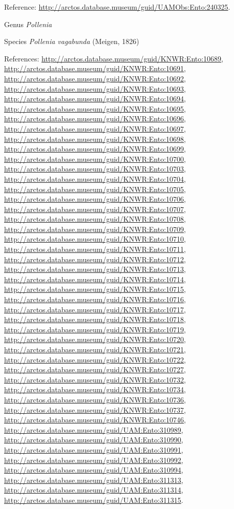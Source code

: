 \documentclass[9pt, article]{memoir}
\begin{document}
\begin{multicols}{2}
\vspace{6pt}Reference: 
\url{http://arctos.database.museum/guid/UAMObs:Ento:240325}.

\vspace{6pt}\noindent\hspace{30pt}Genus \textit{Pollenia}


\vspace{6pt}\noindent\hspace{36pt}Species \textit{Pollenia vagabunda} (Meigen, 1826)


\vspace{6pt}References: 
\url{http://arctos.database.museum/guid/KNWR:Ento:10689}, 
\url{http://arctos.database.museum/guid/KNWR:Ento:10691}, 
\url{http://arctos.database.museum/guid/KNWR:Ento:10692}, 
\url{http://arctos.database.museum/guid/KNWR:Ento:10693}, 
\url{http://arctos.database.museum/guid/KNWR:Ento:10694}, 
\url{http://arctos.database.museum/guid/KNWR:Ento:10695}, 
\url{http://arctos.database.museum/guid/KNWR:Ento:10696}, 
\url{http://arctos.database.museum/guid/KNWR:Ento:10697}, 
\url{http://arctos.database.museum/guid/KNWR:Ento:10698}, 
\url{http://arctos.database.museum/guid/KNWR:Ento:10699}, 
\url{http://arctos.database.museum/guid/KNWR:Ento:10700}, 
\url{http://arctos.database.museum/guid/KNWR:Ento:10703}, 
\url{http://arctos.database.museum/guid/KNWR:Ento:10704}, 
\url{http://arctos.database.museum/guid/KNWR:Ento:10705}, 
\url{http://arctos.database.museum/guid/KNWR:Ento:10706}, 
\url{http://arctos.database.museum/guid/KNWR:Ento:10707}, 
\url{http://arctos.database.museum/guid/KNWR:Ento:10708}, 
\url{http://arctos.database.museum/guid/KNWR:Ento:10709}, 
\url{http://arctos.database.museum/guid/KNWR:Ento:10710}, 
\url{http://arctos.database.museum/guid/KNWR:Ento:10711}, 
\url{http://arctos.database.museum/guid/KNWR:Ento:10712}, 
\url{http://arctos.database.museum/guid/KNWR:Ento:10713}, 
\url{http://arctos.database.museum/guid/KNWR:Ento:10714}, 
\url{http://arctos.database.museum/guid/KNWR:Ento:10715}, 
\url{http://arctos.database.museum/guid/KNWR:Ento:10716}, 
\url{http://arctos.database.museum/guid/KNWR:Ento:10717}, 
\url{http://arctos.database.museum/guid/KNWR:Ento:10718}, 
\url{http://arctos.database.museum/guid/KNWR:Ento:10719}, 
\url{http://arctos.database.museum/guid/KNWR:Ento:10720}, 
\url{http://arctos.database.museum/guid/KNWR:Ento:10721}, 
\url{http://arctos.database.museum/guid/KNWR:Ento:10722}, 
\url{http://arctos.database.museum/guid/KNWR:Ento:10727}, 
\url{http://arctos.database.museum/guid/KNWR:Ento:10732}, 
\url{http://arctos.database.museum/guid/KNWR:Ento:10734}, 
\url{http://arctos.database.museum/guid/KNWR:Ento:10736}, 
\url{http://arctos.database.museum/guid/KNWR:Ento:10737}, 
\url{http://arctos.database.museum/guid/KNWR:Ento:10746}, 
\url{http://arctos.database.museum/guid/UAM:Ento:310989}, 
\url{http://arctos.database.museum/guid/UAM:Ento:310990}, 
\url{http://arctos.database.museum/guid/UAM:Ento:310991}, 
\url{http://arctos.database.museum/guid/UAM:Ento:310992}, 
\url{http://arctos.database.museum/guid/UAM:Ento:310994}, 
\url{http://arctos.database.museum/guid/UAM:Ento:311313}, 
\url{http://arctos.database.museum/guid/UAM:Ento:311314}, 
\url{http://arctos.database.museum/guid/UAM:Ento:311315}.


\end{multicols}
\end{document}
